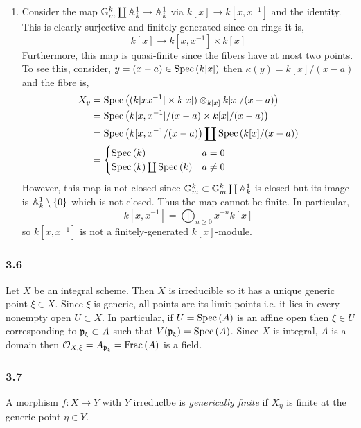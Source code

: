 \documentclass[12pt]{article}
\begin{document}
\begin{enumerate}
\item Consider the map $\mathbb{G}_m^k \coprod \mathbb{A}^1_k \to \mathbb{A}^1_k$ via $k[x] \to k[x,x^{-1}]$ and the identity. This is clearly surjective and finitely generated since on rings it is,
\[ k[x] \to k[x, x^{-1}] \times k[x] \]
Furthermore, this map is quasi-finite since the fibers have at most two points. To see this, consider, $y = (x - a) \in \mathrm{Spec}\left( k[x] \right)$ then $\kappa(y) = k[x]/(x - a)$ and the fibre is,
\begin{align*}
X_y & = \mathrm{Spec}\left( (k[x x^{-1}] \times k[x]) \otimes_{k[x]} k[x]/(x  - a) \right) 
\\
& = \mathrm{Spec}\left( k[x, x^{-1}]/(x - a) \times k[x] / (x - a) \right) 
\\
& = \mathrm{Spec}\left( k[x, x^{-1}/(x - a) \right) \coprod \mathrm{Spec}\left( k[x]/(x - a) \right) 
\\
& = 
\begin{cases}
\mathrm{Spec}\left( k \right) & a = 0
\\
\mathrm{Spec}\left( k \right) \coprod \mathrm{Spec}\left( k \right) & a \neq 0
\end{cases}
\end{align*}
However, this map is not closed since $\mathbb{G}_m^k \subset \mathbb{G}_m^k \coprod \mathbb{A}^1_k$ is closed but its image is $\mathbb{A}^1_k \setminus \{ 0 \}$ which is not closed. Thus the map cannot be finite. In particular,
\[ k[x, x^{-1}] = \bigoplus_{n \ge 0} x^{-n} k[x] \]
so $k[x, x^{-1}]$ is not a finitely-generated $k[x]$-module.  
\end{enumerate}

\subsubsection{3.6}

Let $X$ be an integral scheme. Then $X$ is irreducible so it has a unique generic point $\xi \in X$. Since $\xi$ is generic, all points are its limit points i.e. it lies in every nonempty open $U \subset X$. In particular, if $U = \mathrm{Spec}\left( A \right)$ is an affine open then $\xi \in U$ corresponding to $\mathfrak{p}_\xi \subset A$ such that $V(\mathfrak{p}_\xi) = \mathrm{Spec}\left( A \right)$. Since $X$ is integral, $A$ is a domain then $\mathcal{O}_{X, \xi} = A_{\mathfrak{p}_\xi} = \mathrm{Frac}\left(A\right)$ is a field.

\subsubsection{3.7}

\begin{definition}
A morphism $f : X \to Y$ with $Y$ irreduclbe is \textit{generically finite} if $X_\eta$ is finite at the generic point $\eta \in Y$. 
\end{definition}
\end{document}
